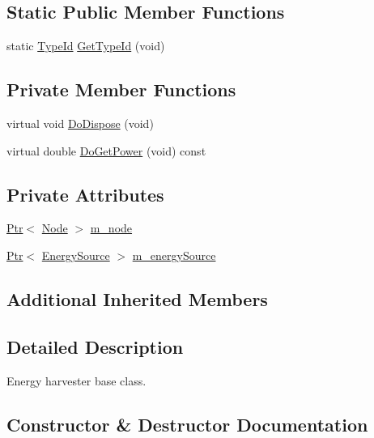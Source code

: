 \subsection*{Static Public Member Functions}
\begin{DoxyCompactItemize}
\item 
static \hyperlink{classns3_1_1TypeId}{Type\+Id} \hyperlink{classns3_1_1EnergyHarvester_a7fb918d1a9a34fa43e48584e6927dcfb}{Get\+Type\+Id} (void)
\end{DoxyCompactItemize}
\subsection*{Private Member Functions}
\begin{DoxyCompactItemize}
\item 
virtual void \hyperlink{classns3_1_1EnergyHarvester_a698680be650c9370c123a847ab66c70b}{Do\+Dispose} (void)
\item 
virtual double \hyperlink{classns3_1_1EnergyHarvester_af1f2a83bbbaee970d1d07eac56f865e0}{Do\+Get\+Power} (void) const 
\end{DoxyCompactItemize}
\subsection*{Private Attributes}
\begin{DoxyCompactItemize}
\item 
\hyperlink{classns3_1_1Ptr}{Ptr}$<$ \hyperlink{classns3_1_1Node}{Node} $>$ \hyperlink{classns3_1_1EnergyHarvester_a99e7942733d35589dca1a59c425f45f4}{m\+\_\+node}
\item 
\hyperlink{classns3_1_1Ptr}{Ptr}$<$ \hyperlink{classns3_1_1EnergySource}{Energy\+Source} $>$ \hyperlink{classns3_1_1EnergyHarvester_a64248d20f3ef24b2bc11d2168fcaf9e6}{m\+\_\+energy\+Source}
\end{DoxyCompactItemize}
\subsection*{Additional Inherited Members}


\subsection{Detailed Description}
Energy harvester base class. 

\subsection{Constructor \& Destructor Documentation}
